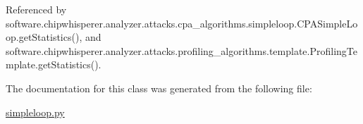 Referenced by software.\+chipwhisperer.\+analyzer.\+attacks.\+cpa\+\_\+algorithms.\+simpleloop.\+C\+P\+A\+Simple\+Loop.\+get\+Statistics(), and software.\+chipwhisperer.\+analyzer.\+attacks.\+profiling\+\_\+algorithms.\+template.\+Profiling\+Template.\+get\+Statistics().



The documentation for this class was generated from the following file\+:\begin{DoxyCompactItemize}
\item 
\hyperlink{simpleloop_8py}{simpleloop.\+py}\end{DoxyCompactItemize}
